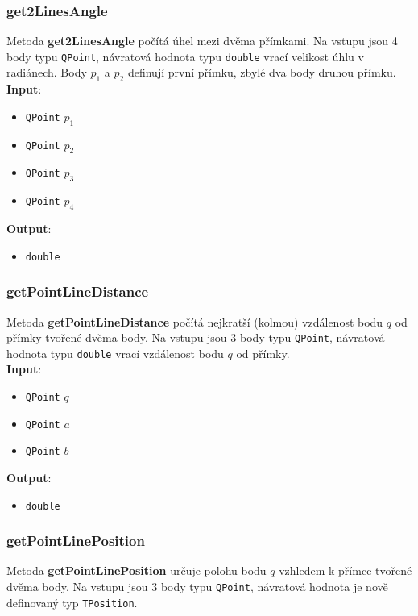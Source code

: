 \documentclass[a4paper, 12pt]{article}
\begin{document}
\subsubsection{get2LinesAngle}
Metoda \textbf{get2LinesAngle} počítá úhel mezi dvěma přímkami. Na vstupu jsou 4 body typu \texttt{QPoint}, návratová hodnota typu \texttt{double} vrací velikost úhlu v radiánech. Body $p_1$ a $p_2$ definují první přímku, zbylé dva body druhou přímku.\\

\textbf{Input}:
\begin{itemize}
\item \texttt{QPoint} $p_1$ 
\item \texttt{QPoint} $p_2$ 
\item \texttt{QPoint} $p_3$
\item \texttt{QPoint} $p_4$
\end{itemize}

\textbf{Output}:
\begin{itemize}
\item \texttt{double} 
\end{itemize}

\subsubsection{getPointLineDistance}
Metoda \textbf{getPointLineDistance} počítá nejkratší (kolmou) vzdálenost bodu $q$ od přímky tvořené dvěma body. Na vstupu jsou 3 body typu \texttt{QPoint}, návratová hodnota typu \texttt{double} vrací vzdálenost bodu $q$ od přímky.\\ 

\textbf{Input}:
\begin{itemize}
\item \texttt{QPoint} $q$ 
\item \texttt{QPoint} $a$ 
\item \texttt{QPoint} $b$
\end{itemize}

\textbf{Output}:
\begin{itemize}
\item \texttt{double} 
\end{itemize}

\subsubsection{getPointLinePosition}
Metoda \textbf{getPointLinePosition} určuje polohu bodu $q$ vzhledem k přímce tvořené dvěma body. Na vstupu jsou 3 body typu \texttt{QPoint}, návratová hodnota je nově definovaný typ \texttt{TPosition}.\\
\end{document}

